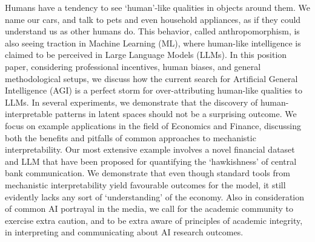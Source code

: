 Humans have a tendency to see `human'-like qualities in objects around them. We name our cars, and talk to pets and even household appliances, as if they could understand us as other humans do. This behavior, called anthropomorphism, is also seeing traction in Machine Learning (ML), where human-like intelligence is claimed to be perceived in Large Language Models (LLMs). 
In this position paper, considering professional incentives, human biases, and general methodological setups, we discuss how the current search for Artificial General Intelligence (AGI) is a perfect storm for over-attributing human-like qualities to LLMs. In several experiments, we demonstrate that the discovery of human-interpretable patterns in latent spaces should not be a surprising outcome. 
We focus on example applications in the field of Economics and Finance, discussing both the benefits and pitfalls of common approaches to mechanistic interpretability. Our most extensive example involves a novel financial dataset and LLM that have been proposed for quantifying the `hawkishness' of central bank communication. We demonstrate that even though standard tools from mechanistic interpretability yield favourable outcomes for the model, it still evidently lacks any sort of `understanding' of the economy. 
Also in consideration of common AI portrayal in the media, we call for the academic community to exercise extra caution, and to be extra aware of principles of academic integrity, in interpreting and communicating about AI research outcomes.